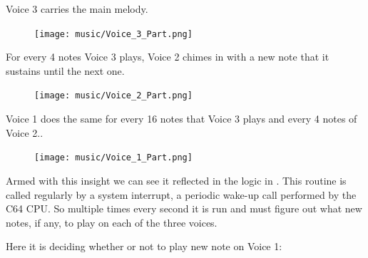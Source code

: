 Voice 3 carries the main melody. 

\begin{figure}[H]
{
  \begin{adjustbox}{width=11cm,center}
  \texttt{[image: music/Voice\_3\_Part.png]}%
    \end{adjustbox}
}
\end{figure}

For every 4 notes Voice 3 plays, Voice 2 chimes in with a new note that it sustains until the next one.

\begin{figure}[H]
{
  \begin{adjustbox}{width=11cm,center}
  \texttt{[image: music/Voice\_2\_Part.png]}%
    \end{adjustbox}
}
\end{figure}

Voice 1 does the same for every 16 notes that Voice 3 plays and every 4 notes of Voice 2..

\begin{figure}[H]
{
  \begin{adjustbox}{width=11cm,center}
  \texttt{[image: music/Voice\_1\_Part.png]}%
    \end{adjustbox}
}
\end{figure}

Armed with this insight we can see it reflected in the logic in . This routine
is called regularly by a system interrupt, a periodic wake-up call performed by the C64 CPU. So multiple
times every second it is run and must figure out what new notes, if any, to play on each of the three
voices.

Here it is deciding whether or not to play new note on Voice 1:


